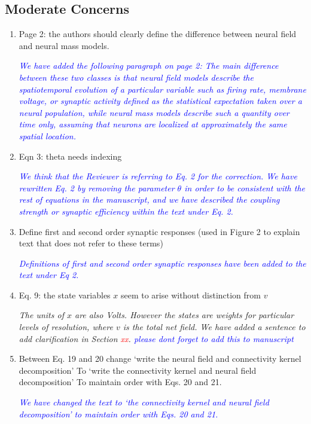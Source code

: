 \documentclass{article}
\newcommand{\dean}[1]{\textcolor{red}{#1}}
\newcommand{\parham}[1]{\textcolor{blue}{#1}}
\begin{document}
			\subsection{Moderate Concerns} 
			\begin{enumerate} 
			 \item Page 2: the authors should clearly define the difference between neural field and neural mass models.
			
			\emph{\parham{We have added the following paragraph on page 2: The main difference between these two classes is that neural field models describe the spatiotemporal evolution of a particular variable such as firing rate, membrane voltage, or synaptic activity defined as the statistical expectation taken over a neural population, while neural mass models describe such a quantity over time only, assuming that neurons are localized at approximately the same spatial location.}}
			
			\item Eqn 3: theta needs indexing 
 
			\emph{\parham{We think that the Reviewer is referring to Eq. 2 for the correction.  We have rewritten Eq. 2 by removing the parameter $\theta$ in order to be consistent with the rest of equations in the manuscript, and we have described the coupling strength or synaptic efficiency within the text under Eq. 2.}}
 			
			\item Define first and second order synaptic responses (used in Figure 2 to explain text that does not refer to these terms)
			
			\emph{\parham{Definitions of first and second order synaptic responses have been added to the text under Eq 2.}}
			
			\item{Eq. 9: the state variables $x$ seem to arise without distinction from $v$}  
			
			\emph{The units of $x$ are also Volts. However the states are weights for particular levels of resolution, where $v$ is the total net field. We have added a sentence to add clarification in Section \dean{xx}. \parham{please dont forget to add this to manuscript}}
			
			\item Between Eq. 19 and 20 change
			`write the neural field and connectivity kernel decomposition' To `write the connectivity kernel and neural field decomposition'
			To maintain order with Eqs. 20 and 21.

			\emph{\parham{We have changed the text to `the connectivity kernel and neural field decomposition' to maintain order with Eqs. 20 and 21.}}
			
			 
			 \end{enumerate}  
\end{document}
